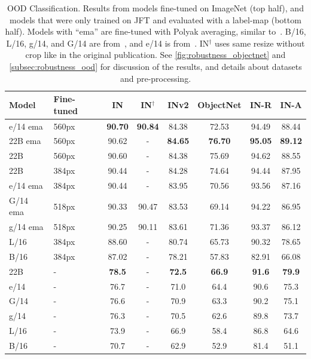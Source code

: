 \documentclass{article}
\begin{document}
\begin{table}[th]
    \caption{
        OOD Classification. Results from models fine-tuned on ImageNet (top half), and models that were only trained on JFT and evaluated with a label-map (bottom half).
        Models with ``ema'' are fine-tuned with Polyak averaging, similar to~\citep{dosovitskiy2020image}.
        B/16, L/16, g/14, and G/14 are from~\citep{zhai2022scaling}, and e/14 is from~\citep{chen2022pali}.
        IN$^\dagger$ uses same resize without crop like in the original publication.
        See \cref{fig:robustness_objectnet} and \cref{subsec:robustness_ood} for discussion of the results, and details about datasets and pre-processing.
    }
    \centering
    \setlength{\tabcolsep}{5pt}
    \begin{tabular}{@{} l l c c c c c c @{}}
        \toprule
        Model & Fine-tuned & IN & IN$^\dagger$ & INv2 & ObjectNet & IN-R & IN-A \\
        \midrule
        e/14 ema & 560px &   \textbf{90.70} & \textbf{90.84} &  84.38 &     72.53 & 94.49 & 88.44 \\
        22B ema & 560px &   90.62 &              - &  \textbf{84.65} &     \textbf{76.70} & \textbf{95.05} & \textbf{89.12} \\
        22B & 560px &   90.60 & - &  84.38 &     75.69 & 94.62 & 88.55 \\
        22B & 384px &   90.44 & - &  84.28 &     74.64 & 94.44 & 87.95 \\
        e/14 ema & 384px &   90.44 & - &  83.95 &     70.56 & 93.56 & 87.16 \\
        G/14 ema & 518px &   90.33 & 90.47 &  83.53 &     69.14 & 94.22 & 86.95 \\
        g/14 ema & 518px &   90.25 & 90.11 &  83.61 &     71.36 & 93.37 & 86.12 \\
        L/16 & 384px &   88.60 & - &  80.74 &     65.73 & 90.32 & 78.65 \\
        B/16 & 384px &   87.02 & - &  78.21 &     57.83 & 82.91 & 66.08 \\
        \midrule
        22B & - &    \textbf{78.5} & - &   \textbf{72.5} &      \textbf{66.9} &  \textbf{91.6} &  \textbf{79.9} \\
        e/14 & - &    76.7 & - &   71.0 &      64.4 &  90.6 &  75.3 \\
        G/14 & - &    76.6 & - &   70.9 &      63.3 &  90.2 &  75.1 \\
        g/14 & - &    76.3 & - &   70.5 &      62.6 &  89.8 &  73.7 \\
        L/16 & - &    73.9 & - &   66.9 &      58.4 &  86.8 &  64.6 \\
        B/16 & - &    70.7 & - &   62.9 &      52.9 &  81.4 &  51.1 \\
        \bottomrule
    \end{tabular}
    \label{tab:robustness_ood}
\end{table}
\end{document}
